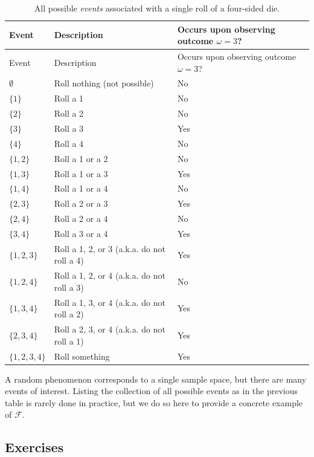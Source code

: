 \documentclass[
  letterpaper,
  DIV=11,
  numbers=noendperiod]{scrreprt}
\theoremstyle{plain}
\theoremstyle{definition}
\theoremstyle{definition}
\theoremstyle{definition}
\theoremstyle{remark}
\begin{document}
\begin{longtable}[]{@{}lll@{}}
\caption{All possible \emph{events} associated with a single roll of a
four-sided die.}\label{tbl-die-events}\tabularnewline
\toprule\noalign{}
Event & Description & Occurs upon observing outcome \(\omega=3\)? \\
\midrule\noalign{}
\endfirsthead
\toprule\noalign{}
Event & Description & Occurs upon observing outcome \(\omega=3\)? \\
\midrule\noalign{}
\endhead
\bottomrule\noalign{}
\endlastfoot
\(\emptyset\) & Roll nothing (not possible) & No \\
\(\{1\}\) & Roll a 1 & No \\
\(\{2\}\) & Roll a 2 & No \\
\(\{3\}\) & Roll a 3 & Yes \\
\(\{4\}\) & Roll a 4 & No \\
\(\{1, 2\}\) & Roll a 1 or a 2 & No \\
\(\{1, 3\}\) & Roll a 1 or a 3 & Yes \\
\(\{1, 4\}\) & Roll a 1 or a 4 & No \\
\(\{2, 3\}\) & Roll a 2 or a 3 & Yes \\
\(\{2, 4\}\) & Roll a 2 or a 4 & No \\
\(\{3, 4\}\) & Roll a 3 or a 4 & Yes \\
\(\{1, 2, 3\}\) & Roll a 1, 2, or 3 (a.k.a. do not roll a 4) & Yes \\
\(\{1, 2, 4\}\) & Roll a 1, 2, or 4 (a.k.a. do not roll a 3) & No \\
\(\{1, 3, 4\}\) & Roll a 1, 3, or 4 (a.k.a. do not roll a 2) & Yes \\
\(\{2, 3, 4\}\) & Roll a 2, 3, or 4 (a.k.a. do not roll a 1) & Yes \\
\(\{1, 2, 3, 4\}\) & Roll something & Yes \\
\end{longtable}

A random phenomenon corresponds to a single sample space, but there are
many events of interest. Listing the collection of all possible events
as in the previous table is rarely done in practice, but we do so here
to provide a concrete example of \(\mathcal{F}\).

\subsection{Exercises}\label{exercises-10}
\end{document}
